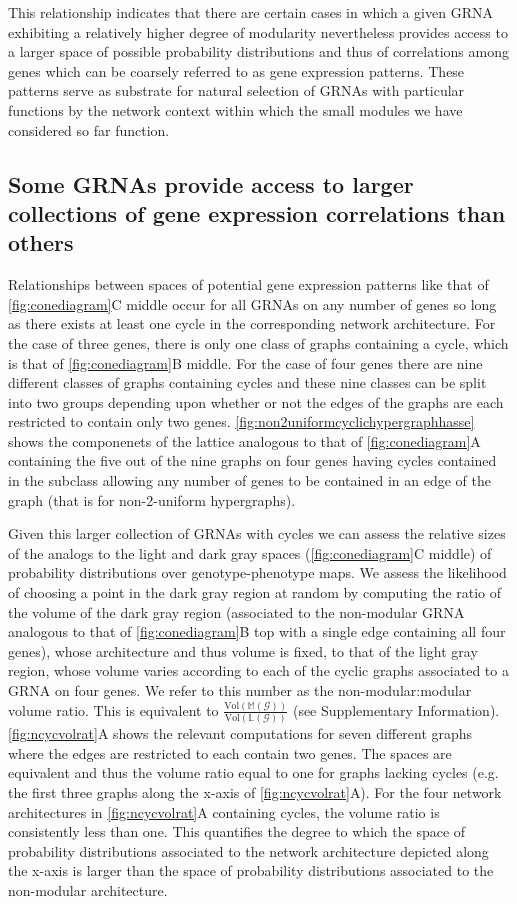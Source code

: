 This relationship indicates that there are certain cases in which a given GRNA exhibiting a relatively higher degree of modularity nevertheless provides access to a larger space of possible probability distributions and thus of correlations among genes which can be coarsely referred to as gene expression patterns. These patterns serve as substrate for natural selection of GRNAs with particular functions by the network context within which the small modules we have considered so far function.

\subsection{Some GRNAs provide access to larger collections of gene expression correlations than others}
Relationships between spaces of potential gene expression patterns like that of \ref{fig:conediagram}C middle occur for all GRNAs on any number of genes so long as there exists at least one cycle in the corresponding network architecture. For the case of three genes, there is only one class of graphs containing a cycle, which is that of \ref{fig:conediagram}B middle. For the case of four genes there are nine different classes of graphs containing cycles and these nine classes can be split into two groups depending upon whether or not the edges of the graphs are each restricted to contain only two genes. \ref{fig:non2uniformcyclichypergraphhasse} shows the componenets of the lattice analogous to that of \ref{fig:conediagram}A containing the five out of the nine graphs on four genes having cycles contained in the subclass allowing any number of genes to be contained in an edge of the graph (that is for non-2-uniform hypergraphs).

Given this larger collection of GRNAs with cycles we can assess the relative sizes of the analogs to the light and dark gray spaces (\ref{fig:conediagram}C middle) of probability distributions over genotype-phenotype maps. We assess the likelihood of choosing a point in the dark gray region at random by computing the ratio of the volume of the dark gray region (associated to the non-modular GRNA analogous to that of \ref{fig:conediagram}B top with a single edge containing all four genes), whose architecture and thus volume is fixed, to that of the light gray region, whose volume varies according to each of the cyclic graphs associated to a GRNA on four genes. We refer to this number as the non-modular:modular volume ratio. This is equivalent to $\frac{\text{Vol}(\mathbb{M}(\mathcal{G}))}{\text{Vol}(\mathbb{L}(\mathcal{G}))}$ (see Supplementary Information).\ref{fig:ncycvolrat}A shows the relevant computations for seven different graphs where the edges are restricted to each contain two genes. The spaces are equivalent and thus the volume ratio equal to one for graphs lacking cycles (e.g. the first three graphs along the x-axis of \ref{fig:ncycvolrat}A). For the four network architectures in \ref{fig:ncycvolrat}A containing cycles, the volume ratio is consistently less than one. This quantifies the degree to which the space of probability distributions associated to the network architecture depicted along the x-axis is larger than the space of probability distributions associated to the non-modular architecture.

